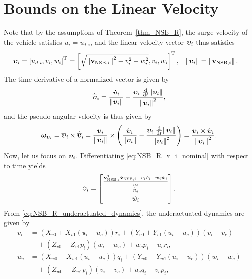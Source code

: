 \section{Bounds on the Linear Velocity}
\label{app:omega_v}
Note that by the assumptions of Theorem~\ref{thm_NSB_R}, the surge velocity of the vehicle satisfies $u_i = u_{d, i}$, and the linear velocity vector $\bm{\upsilon}_i$ thus  satisfies
\begin{align}
    \bm{\upsilon}_i &= \left[u_{d,i}, v_i, w_i\right]^{\mathrm{T}} = \left[\sqrt{\left\|\mathbf{v}_{{\rm NSB}, i}\right\|^2 - v_i^2 - w_i^2}, v_i, w_i\right]^{\mathrm{T}}, &
    \left\|\bm{\upsilon}_i\right\| &= \left\|\mathbf{v}_{{\rm NSB}, i}\right\|.
    \label{eq:NSB_R_v_i_nominal}
\end{align}
The time-derivative of a normalized vector is given by
\begin{equation}
    \dot{\overline{\bm{\upsilon}}}_i = \frac{\dot{\bm{\upsilon}}_i}{\left\|\bm{\upsilon}_i\right\|} - \frac{\bm{\upsilon}_i\,\,\frac{\rm d}{{\rm d}t}\!\left\|\bm{\upsilon}_i\right\|}{\left\|\bm{\upsilon}_i\right\|^2},
\end{equation}
and the pseudo-angular velocity is thus given by
\begin{equation}
    \bm{\omega}_{\bm{\upsilon}_i} = \overline{\bm{\upsilon}}_i \times \dot{\overline{\bm{\upsilon}}}_i
    = \frac{\bm{\upsilon}_i}{\left\|\bm{\upsilon}_i\right\|} \times 
        \left(\frac{\dot{\bm{\upsilon}}_i}{\left\|\bm{\upsilon}_i\right\|} - \frac{\bm{\upsilon}_i\,\,\frac{\rm d}{{\rm d}t}\!\left\|\bm{\upsilon}_i\right\|}{\left\|\bm{\upsilon}_i\right\|^2}\right)
    = \frac{\bm{\upsilon}_i \times \dot{\bm{\upsilon}}_i}{\left\|\bm{\upsilon}_i\right\|^2}.
    \label{eq:NSB_R_omega_v_a1}
\end{equation}
Now, let us focus on $\dot{\bm{\upsilon}}_i$.
Differentiating \eqref{eq:NSB_R_v_i_nominal} with respect to time yields
\begin{equation}
    \dot{\bm{\upsilon}}_i = \begin{bmatrix}
        \frac{\mathbf{v}_{{\rm NSB}, i}^{\mathrm{T}}\dot{\mathbf{v}}_{{\rm NSB}, i} - v_i\dot{v}_i - w_i\dot{w}_i}{u_i} \\
        \dot{v}_i \\
        \dot{w}_i
    \end{bmatrix}.
    \label{eq:NSB_R_v_i_dot}
\end{equation}
From \eqref{eq:NSB_R_underactuated_dynamics}, the underactuated dynamics are given by
\begin{subequations}
    \begin{align}
        \dot{v}_i &= \left(X_{v0} + X_{v1}(u_i-u_c)\right)r_i + \left(Y_{v0} + Y_{v1}(u_i-u_c)\right)(v_i-v_c) \nonumber \\
        &\quad + \left(Z_{v0} + Z_{v1}p_i\right)(w_i-w_c) + w_cp_i - u_cr_i, \\
        \dot{w}_i &= \left(X_{w0} + X_{w1}(u_i-u_c)\right)q_i + \left(Y_{w0} + Y_{w1}(u_i-u_c)\right)(w_i-w_c) \nonumber \\
        &\quad + \left(Z_{w0} + Z_{w1}p_i\right)(v_i-v_c) + u_cq_i - v_cp_i,
    \end{align}
    \label{eq:NSB_R_underactuated_dynamics_expanded}
\end{subequations}
